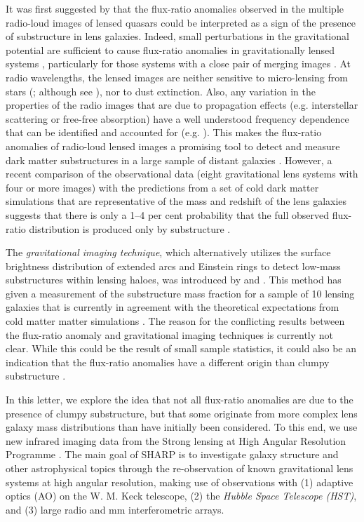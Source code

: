 \documentclass[a4paper,fleqn,usenatbib,useAMS]{mnras}
\begin{document}
It was first suggested by \citet{Mao1998} that the flux-ratio anomalies observed in the multiple radio-loud images of lensed quasars could be interpreted as a sign of the presence of substructure in lens galaxies. Indeed, small perturbations in the gravitational potential are sufficient to cause flux-ratio anomalies in gravitationally lensed systems \citep{metcalf01,Dalal2002,Bradac02}, particularly for those systems with a close pair of merging images \citep{KD04}. At radio wavelengths, the lensed images are neither sensitive to micro-lensing from stars (\citealt{K03}; although see \citealt{koopmans00}), nor to dust extinction. Also, any variation in the properties of the radio images that are due to propagation effects (e.g. interstellar scattering or free-free absorption) have a well understood frequency dependence that can be identified and accounted for (e.g. \citealt{biggs03,M07,winn04}). This makes the flux-ratio anomalies of radio-loud lensed images a promising tool to detect and measure dark matter substructures in a large sample of distant galaxies \citep{Dalal2002}. However, a recent comparison of the observational data (eight gravitational lens systems with four or more images) with the predictions from a set of cold dark matter simulations that are representative of the mass and redshift of the lens galaxies suggests that there is only a 1--4 per cent probability that the full observed flux-ratio distribution is produced only by substructure \citep{Xu15}.

The \emph{gravitational imaging technique}, which alternatively utilizes the surface brightness distribution of extended arcs and Einstein rings to detect low-mass substructures within lensing haloes, was introduced by \citet{K05} and \citet{V09}. This method has given a measurement of the substructure mass fraction for a sample of 10 lensing galaxies that is currently in agreement with the theoretical expectations from cold matter matter simulations \citep{V14a,V12}. The reason for the conflicting results between the flux-ratio anomaly and gravitational imaging techniques is currently not clear.  While this could be the result of small sample statistics, it could also be an indication that the flux-ratio anomalies have a different origin than clumpy substructure \citep[see][for a discussion]{Xu15}.

 
In this letter, we explore the idea that not all flux-ratio anomalies are due to the presence of clumpy substructure, but that some originate from more complex lens galaxy mass distributions than have initially been considered. To this end, we use new infrared imaging data from the Strong lensing at High Angular Resolution Programme \citep[SHARP;][]{mckean07,lagattuta10,SHARP12, V12}. The main goal of SHARP is to investigate galaxy structure and other astrophysical topics through the re-observation of known gravitational lens systems at high angular resolution, making use of observations with (1) adaptive optics (AO) on the W. M. Keck telescope, (2) the {\it Hubble Space Telescope (HST)}, and (3) large radio and mm interferometric arrays. 
\end{document}
